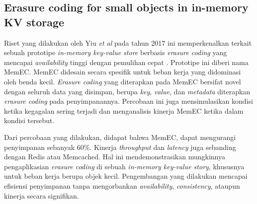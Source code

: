 \subsection{Erasure coding for small objects in in-memory KV storage}
\label{subsection:erasure-small-objects}

Riset yang dilakukan oleh Yiu \textit{et al} pada tahun 2017 ini memperkenalkan terkait sebuah prototipe \textit{in-memory key-value store} berbasis \textit{erasure coding} yang mencapai \textit{availability} tinggi dengan pemulihan cepat \parencite{yiu2017erasure}. Prototipe ini diberi nama MemEC. MemEC didesain secara spesifik untuk beban kerja yang didominasi oleh benda kecil. \textit{Erasure coding} yang diterapkan pada MemEC bersifat novel dengan seluruh data yang disimpan, berupa \textit{key}, \textit{value}, dan \textit{metadata} diterapkan \textit{erasure coding} pada penyimpanannya. Percobaan ini juga mensimulasikan kondisi ketika kegagalan sering terjadi dan menganalisis kinerja MemEC ketika dalam kondisi tersebut.

Dari percobaan yang dilakukan, didapat bahwa MemEC, dapat mengurangi penyimpanan sebanyak 60\%. Kinerja \textit{throughput} dan \textit{latency} juga sebanding dengan Redis atau Memcached. Hal ini mendemonstrasikan mungkinnya pengaplikasian \textit{erasure coding} di sebuah \textit{in-memory key-value story}, khususnya untuk beban kerja berupa objek kecil. Pengembangan yang dilakukan mencapai efisiensi penyimpanan tanpa mengorbankan \textit{availability}, \textit{consistency}, ataupun kinerja secara signifikan.

